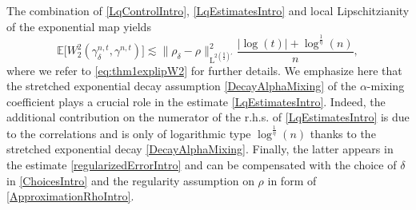 \documentclass[11pt,a4paper,oneside]{amsart}
\numberwithin{equation}{section}
\newcommand{\LL}{\mathrm{L}}
\begin{document}
The combination of \eqref{LqControlIntro}, \eqref{LqEstimatesIntro} and local Lipschitzianity of the exponential map yields
%
\begin{equation}\label{regularizedErrorIntro}
%
\mathbb{E}\big[W^2_2(\gamma^{n,t}_\delta,\gamma^{n,t})\big]\lesssim \|\rho_\delta-\rho\|^2_{\LL^{2(\frac{\bar{q}}{2})'}}\frac{\vert \log(t)\vert+\log^{\frac{1}{\eta}}(n)}{n},
%
\end{equation}
%
 where we refer to \eqref{eq:thm1explipW2} for further details. We emphasize here that the stretched exponential decay assumption \eqref{DecayAlphaMixing} of the $\alpha$-mixing coefficient plays a crucial role in the estimate \eqref{LqEstimatesIntro}. Indeed, the additional contribution on the numerator of the r.h.s. of \eqref{LqEstimatesIntro} is due to the correlations and is only of logarithmic type $\log^{\frac{1}{\eta}}(n)$ thanks to the stretched exponential decay \eqref{DecayAlphaMixing}. Finally, the latter appears in the estimate \eqref{regularizedErrorIntro} and can be compensated with the choice of $\delta$ in \eqref{ChoicesIntro} and the regularity assumption on $\rho$ in form of \eqref{ApproximationRhoIntro}.
%
\end{document}

